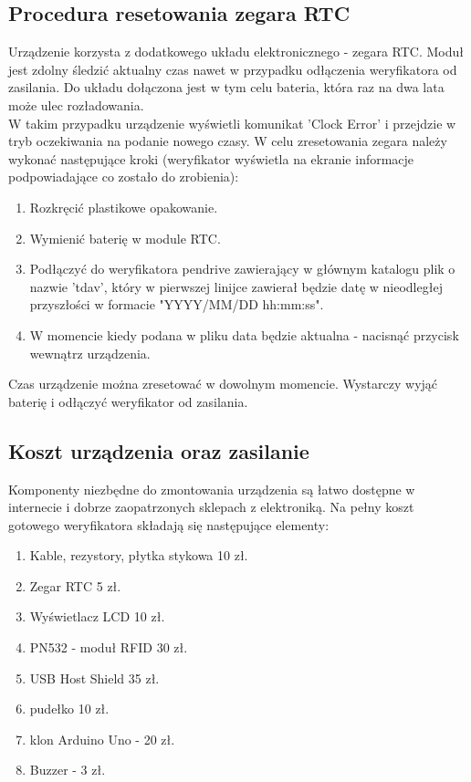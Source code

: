 \documentclass[declaration,shortabstract, mgr]{iithesis}
\begin{document}
\subsection{Procedura resetowania zegara RTC}
\indent Urządzenie korzysta z dodatkowego układu elektronicznego - zegara RTC. Moduł jest zdolny śledzić aktualny czas nawet w przypadku odłączenia weryfikatora od zasilania. Do układu dołączona jest w tym celu bateria, która raz na dwa lata może ulec rozładowania.\\
\indent W takim przypadku urządzenie wyświetli komunikat 'Clock Error' i przejdzie w tryb oczekiwania na podanie nowego czasy. W celu zresetowania zegara należy wykonać następujące kroki (weryfikator wyświetla na ekranie informacje podpowiadające co zostało do zrobienia):
\begin{enumerate}
\item Rozkręcić plastikowe opakowanie.
\item Wymienić baterię w module RTC.
\item Podłączyć do weryfikatora pendrive zawierający w głównym katalogu plik o nazwie 'tdav', który w pierwszej linijce zawierał będzie datę w nieodległej przyszłości w formacie "YYYY/MM/DD hh:mm:ss".
\item W momencie kiedy podana w pliku data będzie aktualna - nacisnąć przycisk wewnątrz urządzenia.
\end{enumerate}
\indent Czas urządzenie można zresetować w dowolnym momencie. Wystarczy wyjąć baterię i odłączyć weryfikator od zasilania.
\subsection{Koszt urządzenia oraz zasilanie}
\indent Komponenty niezbędne do zmontowania urządzenia są łatwo dostępne w internecie i dobrze zaopatrzonych sklepach z elektroniką. Na pełny koszt gotowego weryfikatora składają się następujące elementy:
\begin{enumerate}
\item Kable, rezystory, płytka stykowa 10 zł.
\item Zegar RTC 5 zł.
\item Wyświetlacz LCD 10 zł.
\item PN532 - moduł RFID 30 zł.
\item USB Host Shield 35 zł.
\item pudełko 10 zł.
\item klon Arduino Uno - 20 zł.
\item Buzzer - 3 zł.
\end{enumerate}
\end{document}
